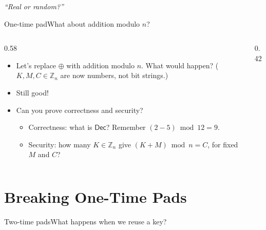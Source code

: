 \ifdefined\PRESENTATION\else\PassOptionsToClass{handout}{beamer}\fi\documentclass[aspectratio=169, lualatex]{beamer}
\begin{document}
\begin{frame}
	\begin{center}
		\huge \textit{``Real or random?''}
	\end{center}
\end{frame}

\begin{frame}{One-time pad}{What about addition modulo $n$?}
	\begin{columns}[c]
		\begin{column}{0.58\textwidth}
			\begin{itemize}[<+->]
				\item Let's replace $\oplus$ with addition modulo $n$. What would happen? ($K, M, C \in \mathbb{Z}_n$ are now numbers, not bit strings.)
				\item Still good!
				\item Can you prove correctness and security?
				      \begin{itemize}[<+->]
					      \item Correctness: what is $\textsf{Dec}$? Remember $(2 - 5) \bmod 12 = 9$.
					      \item Security: how many $K \in \mathbb{Z}_n$ give $(K + M) \bmod n = C$, for fixed $M$ and $C$?
				      \end{itemize}
			\end{itemize}
		\end{column}
		\begin{column}{0.42\textwidth}
		\end{column}
	\end{columns}
\end{frame}

\section{Breaking One-Time Pads}

\begin{frame}{Two-time pads}{What happens when we reuse a key?}
	\begin{columns}[c]
	\end{columns}
\end{frame}
\end{document}
